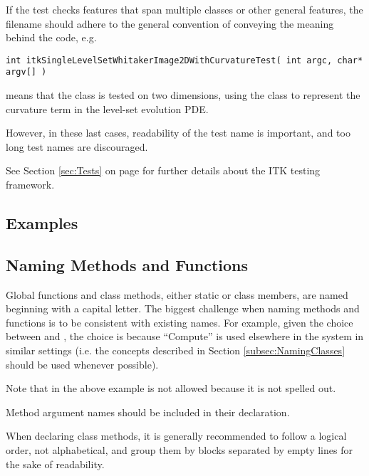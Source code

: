 If the test checks features that span multiple classes or other general
features, the filename should adhere to the general convention of conveying the
meaning behind the code, e.g.
\small
\begin{verbatim}
int itkSingleLevelSetWhitakerImage2DWithCurvatureTest( int argc, char* argv[] )
\end{verbatim}
\normalsize

means that the  class is tested on two
dimensions, using the  class to
represent the curvature term in the level-set evolution PDE.

However, in these last cases, readability of the test name is important, and too
long test names are discouraged.

See Section \ref{sec:Tests} on page \pageref{sec:Tests} for further details
about the ITK testing framework.


\subsection{Examples}
\label{subsec:Examples}


\subsection{Naming Methods and Functions}
\label{subsec:NamingMethodsAndFunctions}

Global functions and class methods, either static or class members, are named
beginning with a capital letter. The biggest challenge when naming methods and
functions is to be consistent with existing names. For example, given the choice
between  and , the
choice is   because ``Compute'' is used elsewhere in
the system in similar settings (i.e. the concepts described in Section
\ref{subsec:NamingClasses} should be used whenever possible).

Note that in the above example  is not allowed because
it is not spelled out.

Method argument names should be included in their declaration.

When declaring class methods, it is generally recommended to follow a logical
order, not alphabetical, and group them by blocks separated by empty
lines for the sake of readability.

